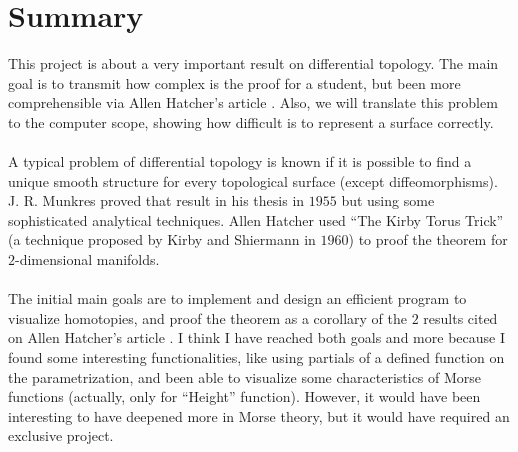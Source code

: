 %

\chapter{Summary}
This project is about a very important result on differential topology. The main goal is to transmit how complex is the proof for a student, but been more comprehensible via Allen Hatcher's article \cite{arXiv:1312.3518}. Also, we will translate this problem to the computer scope, showing how difficult is to represent a surface correctly.\\
\\A typical problem of differential topology is known if it is possible to find a unique smooth structure for every topological surface (except diffeomorphisms). J. R. Munkres proved that result in his thesis in $1955$ but using some sophisticated analytical techniques. Allen Hatcher used ``The Kirby Torus Trick'' (a technique proposed by Kirby and Shiermann in $1960$) to proof the theorem for $2$-dimensional manifolds.\\
\\The initial main goals are to implement and design an efficient program to visualize homotopies, and proof the theorem as a corollary of the $2$ results cited on Allen Hatcher's article \cite{arXiv:1312.3518}. I think I have reached both goals and more because I found some interesting functionalities, like using partials of a defined function on the parametrization, and been able to visualize some characteristics of Morse functions (actually, only for ``Height'' function). However, it would have been interesting to have deepened more in Morse theory, but it would have required an exclusive project.\\

